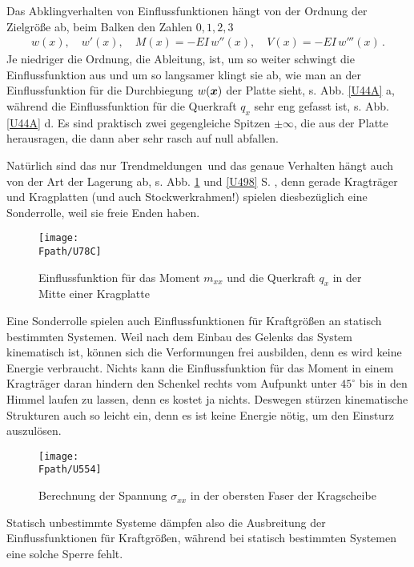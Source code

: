 Das Abklingverhalten von Einflussfunktionen h\"{a}ngt von der Ordnung der Zielgr\"{o}{\ss}e ab, beim Balken den Zahlen $0, 1, 2, 3$
\begin{align}
w(x), \quad w'(x), \quad M(x) = - EI\,w''(x), \quad V(x) = - EI\,w'''(x)\,.
\end{align}
Je niedriger die Ordnung, die Ableitung, ist, um so weiter schwingt die Einflussfunktion aus und um so langsamer klingt sie ab, wie man an der Einflussfunktion f\"{u}r die Durchbiegung $w(\mbox{\boldmath $x$})$ der Platte sieht, s. Abb. \ref{U44A} a, w\"{a}hrend die Einflussfunktion f\"{u}r die Querkraft $q_x$ sehr eng gefasst ist, s. Abb. \ref{U44A} d. Es sind praktisch zwei gegengleiche Spitzen $\pm \infty$, die aus der Platte herausragen, die dann aber sehr rasch auf null abfallen.

Nat\"{u}rlich sind das nur \glq Trendmeldungen\grq\ und das genaue Verhalten h\"{a}ngt auch von der Art der Lagerung ab, s. Abb. \ref{U78B} und \ref{U498} S. \pageref{U498}, denn gerade Kragtr\"{a}ger und Kragplatten (und auch  Stockwerkrahmen!) spielen diesbez\"{u}glich eine Sonderrolle, weil sie freie Enden haben.

\begin{figure}[tbp]
\centering
\texttt{[image: \\Fpath/U78C]}
\caption{Einflussfunktion f\"{u}r das Moment $m_{xx}$ und die Querkraft $q_x$ in der Mitte einer Kragplatte}
\label{U78B}%
\end{figure}%

Eine Sonderrolle spielen auch Einflussfunktionen f\"{u}r Kraftgr\"{o}{\ss}en an statisch bestimmten Systemen. Weil nach dem Einbau des Gelenks das System kinematisch ist, k\"{o}nnen sich die Verformungen frei ausbilden, denn es wird keine Energie verbraucht. Nichts kann die Einflussfunktion f\"{u}r das Moment in einem Kragtr\"{a}ger daran hindern den Schenkel rechts vom Aufpunkt unter $45^\circ$ bis \glq in den Himmel\grq{} laufen zu lassen, denn es kostet ja nichts. Deswegen st\"{u}rzen kinematische Strukturen auch so leicht ein, denn es ist keine Energie n\"{o}tig, um den Einsturz auszul\"{o}sen.
\begin{figure}[tbp]
\centering
\texttt{[image: \\Fpath/U554]}
\caption{Berechnung der Spannung $\sigma_{xx}$ in der obersten Faser der Kragscheibe}
\label{U554}%
\end{figure}%
Statisch unbestimmte Systeme d\"{a}mpfen also die Ausbreitung der Einflussfunktionen f\"{u}r Kraftgr\"{o}{\ss}en, w\"{a}hrend bei statisch bestimmten Systemen eine solche Sperre fehlt.

